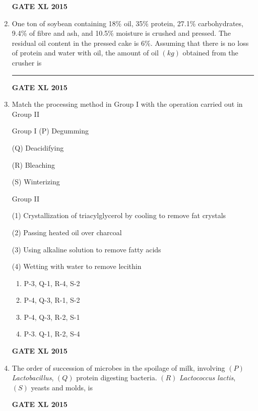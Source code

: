 \documentclass[journal,12pt,onecolumn]{IEEEtran}
\begin{document}
\begin{enumerate}
\hfill{\textbf{GATE XL 2015}}

\item One ton of soybean containing 18\% oil, 35\% protein, 27.1\% carbohydrates, 9.4\% of fibre and ash, and 10.5\% moisture is crushed and pressed. The residual oil content in the pressed cake is 6\%. Assuming that there is no loss of protein and water with oil, the amount of oil $(kg)$ obtained from the crusher is \rule{1cm}{0.15mm}
\hfill{\textbf{GATE XL 2015}}
\item  Match the processing method in Group I with the operation carried out in Group II

	\begin{minipage}{0.5\textwidth}\begin{flushleft}
	Group I
		(P) Degumming

		(Q) Deacidifying

		(R) Bleaching

		(S) Winterizing

	\end{flushleft}
	\end{minipage}
	\begin{minipage}{0.5\textwidth}\begin{flushleft}
Group II

		(1) Crystallization of triacylglycerol by cooling to remove fat crystals

		(2) Passing heated oil over charcoal

		(3) Using alkaline solution to remove fatty acids

		(4) Wetting with water to remove lecithin
	\end{flushleft}
	\end{minipage}
    \begin{enumerate}
            \item P-3, Q-1, R-4, S-2
	    \item P-4, Q-3, R-1, S-2
	    \item P-4, Q-3, R-2, S-1
            \item P-3. Q-1, R-2, S-4
    \end{enumerate}
\hfill{\textbf{GATE XL 2015}}
\item The order of succession of microbes in the spoilage of milk, involving $(P)$ \textit{Lactobacillus}, $(Q)$ protein digesting bacteria. $(R)$ \textit{Lactococcus lactis}, $(S)$ yeasts and molds, is
    \begin{enumerate}
	\begin{multicols}{4}
            \item $S>R>Q>P$
	    \item $S>Q>R>P$
	    \item $R>P>S>Q$
            \item $Q>S>P>R$
	\end{multicols}
    \end{enumerate}
\hfill{\textbf{GATE XL 2015}}


\end{enumerate}
\end{document}
